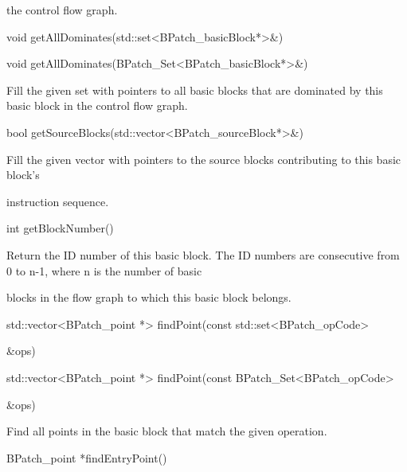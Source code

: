 {{{the control flow graph.}



{

void getAllDominates(std::set<BPatch_basicBlock*>&)}



{

void getAllDominates(BPatch_Set<BPatch_basicBlock*>&)}



{

Fill the given set with pointers to all basic blocks that are dominated by this basic block in the control flow graph.}



{

bool getSourceBlocks(std::vector<BPatch_sourceBlock*>&)}



{

Fill the given vector with pointers to the source blocks contributing to this basic block's

instruction sequence.}



{

int getBlockNumber()}



{

Return the ID number of this basic block. The ID numbers are consecutive from 0 to n-1, where n is the number of basic

blocks in the flow graph to which this basic block belongs.}



{

std::vector<BPatch_point *> findPoint(const std::set<BPatch_opCode>

&ops)}



{

std::vector<BPatch_point *> findPoint(const BPatch_Set<BPatch_opCode>

&ops)}



{

Find all points in the basic block that match the given operation.}



{

BPatch_point *findEntryPoint()}



}}
